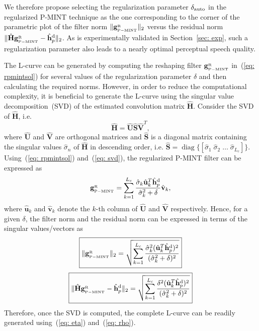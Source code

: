 \documentclass[draftcls,onecolumn,11pt]{IEEEtran}
\DeclareMathOperator{\diag}{diag}
\begin{document}
We therefore propose selecting the regularization parameter $\delta_{\rm auto}$ in the regularized P-MINT technique as the one corresponding to the corner of the parametric plot of the filter norm $\|\mathbf{g}_{{}_{\rm P-MINT}}^{_{\rm R}}\|_2$ versus the residual norm $\|\hat{\mathbf{H}}\mathbf{g}_{{}_{\rm P-MINT}}^{_{\rm R}} - \hat{\mathbf{h}}_p^{\rm d}\|_2$.
As is experimentally validated in Section~\ref{sec: exp}, such a regularization parameter also leads to a nearly optimal perceptual speech quality.

The L-curve can be generated by computing the reshaping filter $\mathbf{g}_{{}_{\rm P-MINT}}^{_{\rm R}}$ in~(\ref{eq: rpmintsol}) for several values of the regularization parameter $\delta$ and then calculating the required norms.
However, in order to reduce the computational complexity, it is beneficial to generate the L-curve using the singular value decomposition~(SVD) of the estimated convolution matrix $\hat{\mathbf{H}}$.
Consider the SVD of $\hat{\mathbf{H}}$, i.e.
\begin{equation}
\label{eq: svd}
  \hat{\mathbf{H}} = \hat{\mathbf{U}}\hat{\mathbf{S}}\hat{\mathbf{V}}^T,
\end{equation}
where $\hat{\mathbf{U}}$ and $\hat{\mathbf{V}}$ are orthogonal matrices and $\hat{\mathbf{S}}$ is a diagonal matrix containing the singular values $\hat{\sigma}_n$ of $\hat{\mathbf{H}}$ in descending order, i.e. $\hat{\mathbf{S}} = {\diag}\{\left[\hat{\sigma}_1 \; \hat{\sigma}_2 \; \ldots \; \hat{\sigma}_{L_c}\right]\}$.
Using~(\ref{eq: rpmintsol}) and~(\ref{eq: svd}), the regularized P-MINT filter can be expressed as
\begin{equation}
\mathbf{g}_{{}_{\rm P-MINT}}^{_{\rm R}}  =  \sum_{k=1}^{L_c} \frac{\hat{\sigma}_k \hat{\mathbf{u}}_k^T \hat{\mathbf{h}}_p^{\rm d} }{\hat{\sigma}_k^2+\delta}  \hat{\mathbf{v}}_k,
\end{equation}
where $\hat{\mathbf{u}}_k$ and $\hat{\mathbf{v}}_k$ denote the $k$-th column of $\hat{\mathbf{U}}$ and $\hat{\mathbf{V}}$ respectively.
Hence, for a given $\delta$, the filter norm and the residual norm can be expressed in terms of the singular values/vectors as
\begin{equation}
\label{eq: eta}
\boxed{\|\mathbf{g}_{{}_{\rm P-MINT}}^{_{\rm R}}\|_2 = \sqrt{\sum_{k = 1}^{L_c} \frac{\hat{\sigma}_k^2 (\hat{\mathbf{u}}_k^T \hat{\mathbf{h}}_p^{\rm d})^2}{(\hat{\sigma}_k^2 + \delta)^2}}}
\end{equation}
\begin{equation}
\label{eq: rho}
\boxed{ \|\hat{\mathbf{H}}\mathbf{g}_{{}_{\rm P-MINT}}^{_{\rm R}} - \hat{\mathbf{h}}_p^{\rm d}\|_2 = \sqrt{\sum_{k = 1}^{L_c} \frac{\delta^2 (\hat{\mathbf{u}}_k^T \hat{\mathbf{h}}_p^{\rm d})^2}{(\hat{\sigma}_k^2 + \delta)^2}}}
\end{equation}
Therefore, once the SVD is computed, the complete L-curve can be readily generated using~(\ref{eq: eta}) and~(\ref{eq: rho}).
\end{document}
